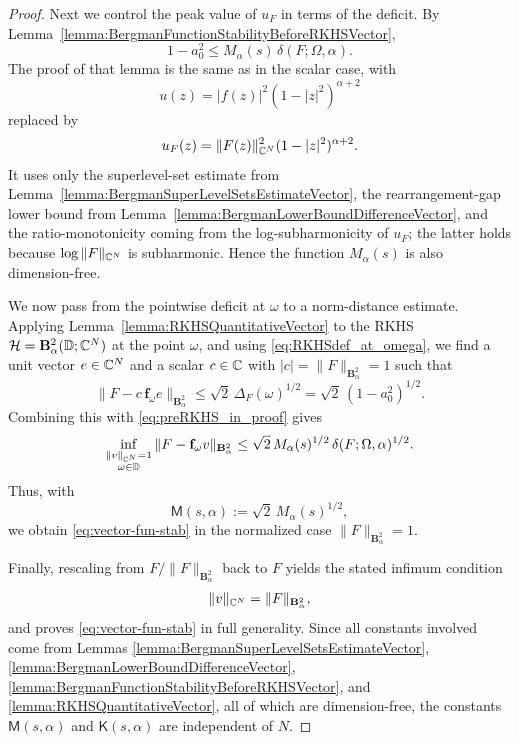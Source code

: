 \documentclass[a4paper,10pt]{amsart}
\newcommand{\D}{\mathbb{D}}
\newcommand{\Berg}{\mathbf{B}_{\alpha}^2}
\begin{document}
\begin{proof}
Next we control the peak value of $u_F$ in terms of the deficit. By Lemma~\ref{lemma:BergmanFunctionStabilityBeforeRKHSVector},
\begin{equation}\label{eq:preRKHS_in_proof}
1-a_0^2 \le M_\alpha(s)\,\delta(F;\Omega,\alpha).
\end{equation}
The proof of that lemma is the same as in the scalar case, with
\[
u(z)=|f(z)|^2(1-|z|^2)^{\alpha+2}
\]
replaced by
\[
u_F(z)=\|F(z)\|_{\mathbb{C}^N}^2(1-|z|^2)^{\alpha+2}.
\]
It uses only the superlevel-set estimate from Lemma~\ref{lemma:BergmanSuperLevelSetsEstimateVector}, the rearrangement-gap lower bound from Lemma~\ref{lemma:BergmanLowerBoundDifferenceVector}, and the ratio-monotonicity coming from the log-subharmonicity of $u_F$; the latter holds because $\log\|F\|_{\mathbb{C}^N}$ is subharmonic. Hence the function $M_\alpha(s)$ is also dimension-free.

We now pass from the pointwise deficit at $\omega$ to a norm-distance estimate. Applying Lemma~\ref{lemma:RKHSQuantitativeVector} to the RKHS $\mcalH=\mathbf B_\alpha^2(\D;\C^N)$ at the point $\omega$, and using \eqref{eq:RKHSdef_at_omega}, we find a unit vector $e\in\mathbb{C}^N$ and a scalar $c\in\mathbb{C}$ with $|c|=\|F\|_{\Berg}=1$ such that
\[
\|F-c\,\mathbf f_\omega e\|_{\Berg}
\le \sqrt2\,\Delta_F(\omega)^{1/2}
=\sqrt2\,(1-a_0^2)^{1/2}.
\]
Combining this with \eqref{eq:preRKHS_in_proof} gives
\[
\inf_{\substack{\|v\|_{\C^N}=1\\ \omega\in\D}}
\|F-\mathbf f_\omega v\|_{\Berg}
\le \sqrt2\,M_\alpha(s)^{1/2}\,\delta(F;\Omega,\alpha)^{1/2}.
\]
Thus, with
\[
\mathsf M(s,\alpha):=\sqrt2\,M_\alpha(s)^{1/2},
\]
we obtain \eqref{eq:vector-fun-stab} in the normalized case $\|F\|_{\Berg}=1$.

Finally, rescaling from $F/\|F\|_{\Berg}$ back to $F$ yields the stated infimum condition
\[
\|v\|_{\C^N}=\|F\|_{\Berg},
\]
and proves \eqref{eq:vector-fun-stab} in full generality. Since all constants involved come from Lemmas
\ref{lemma:BergmanSuperLevelSetsEstimateVector},
\ref{lemma:BergmanLowerBoundDifferenceVector},
\ref{lemma:BergmanFunctionStabilityBeforeRKHSVector}, and
\ref{lemma:RKHSQuantitativeVector},
all of which are dimension-free, the constants $\mathsf M(s,\alpha)$ and $\mathsf K(s,\alpha)$ are independent of $N$.
\end{proof}
 

\medskip
\end{document}
